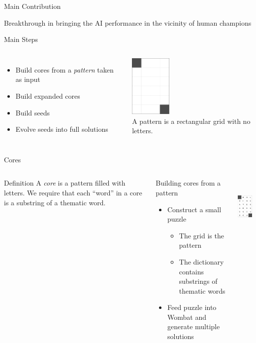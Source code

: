 \documentclass[aspectratio=169,usenames,dvipsnames]{beamer}
\newcommand{\bei}{\begin{itemize}}
\newcommand{\eei}{\end{itemize}}
\newcommand{\ie}{\item}
\numberwithin{equation}{section}
\numberwithin{theorem}{section}
\numberwithin{lem}{section}
\numberwithin{df}{section}
\begin{document}
\begin{frame}{Main Contribution}

Breakthrough in bringing the AI performance in the vicinity of human champions

\end{frame}

\begin{frame}{Main Steps}

\begin{columns}
\bei
\ie Build cores from a \emph{pattern} taken as input
\ie Build expanded cores
\ie Build seeds
\ie Evolve seeds into full solutions
\eei
{}
\centering
\includegraphics[height=3cm]{_plots/6x4-puzzle.png}\\
A pattern is a rectangular grid with no letters.
\end{columns}

\end{frame}


\begin{frame}{Cores}

\begin{columns}
\begin{block}{Definition}
A \emph{core} is a pattern filled with letters. We require that each ``word'' in a core is a substring of a thematic word.
\end{block}
\begin{block}{Building cores from a pattern}
\bei
\ie Construct a small puzzle
\bei 
\ie The grid is the pattern
\ie The dictionary contains substrings of thematic words
\eei
\ie Feed puzzle into {\sc Wombat} and generate multiple solutions
\eei
\end{block}
\centering
\includegraphics[height=3cm]{_plots/core-6x4-puzzle.png}
\end{columns}

\end{frame}
\end{document}
